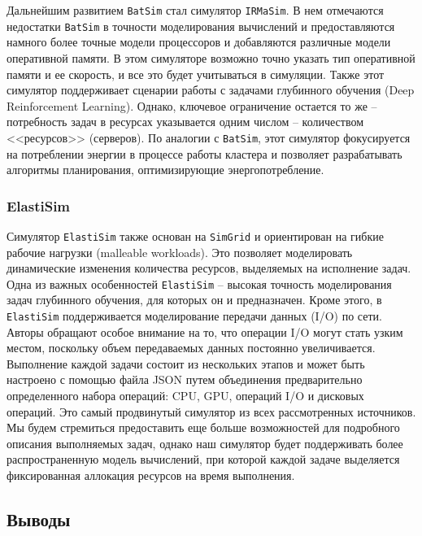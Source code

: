Дальнейшим развитием \texttt{BatSim} стал симулятор \texttt{IRMaSim}\cite{irmasim-article}. В нем отмечаются недостатки \texttt{BatSim} в точности моделирования вычислений и предоставляются намного более точные модели процессоров и добавляются различные модели оперативной памяти. В этом симуляторе возможно точно указать тип оперативной памяти и ее скорость, и все это будет учитываться в симуляции. Также этот симулятор поддерживает сценарии работы с задачами глубинного обучения (Deep Reinforcement Learning). Однако, ключевое ограничение остается то же -- потребность задач в ресурсах указывается одним числом -- количеством <<ресурсов>> (серверов). По аналогии с \texttt{BatSim}, этот симулятор фокусируется на потреблении энергии в процессе работы кластера и позволяет разрабатывать алгоритмы планирования, оптимизирующие энергопотребление. 

\subsubsection{ElastiSim}

Симулятор \texttt{ElastiSim}\cite{elastisim-article} также основан на \texttt{SimGrid} и ориентирован на гибкие рабочие нагрузки (malleable workloads). Это позволяет моделировать динамические изменения количества ресурсов, выделяемых на исполнение задач. Одна из важных особенностей \texttt{ElastiSim} -- высокая точность моделирования задач глубинного обучения, для которых он и предназначен. Кроме этого, в \texttt{ElastiSim} поддерживается моделирование передачи данных (I/O) по сети. Авторы обращают особое внимание на то, что операции I/O могут стать узким местом, поскольку объем передаваемых данных постоянно увеличивается. Выполнение каждой задачи состоит из нескольких этапов и может быть настроено с помощью файла JSON путем объединения предварительно определенного набора операций: CPU, GPU, операций I/O и дисковых операций. Это самый продвинутый симулятор из всех рассмотренных источников. Мы будем стремиться предоставить еще больше возможностей для подробного описания выполняемых задач, однако наш симулятор будет поддерживать более распространенную модель вычислений, при которой каждой задаче выделяется фиксированная аллокация ресурсов на время выполнения.

\subsection{Выводы}

